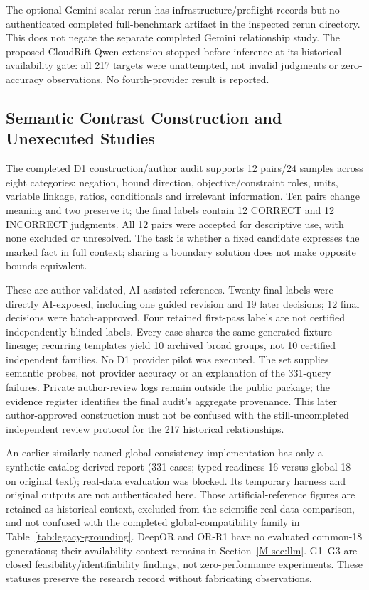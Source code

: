 The optional Gemini scalar rerun has infrastructure/preflight records but no authenticated completed full-benchmark artifact in the inspected rerun directory. This does not negate the separate completed Gemini relationship study. The proposed CloudRift Qwen extension stopped before inference at its historical availability gate: all 217 targets were unattempted, not invalid judgments or zero-accuracy observations. No fourth-provider result is reported.

\subsection{Semantic Contrast Construction and Unexecuted Studies}
The completed D1 construction/author audit supports 12 pairs/24 samples across eight categories: negation, bound direction, objective/constraint roles, units, variable linkage, ratios, conditionals and irrelevant information. Ten pairs change meaning and two preserve it; the final labels contain 12 CORRECT and 12 INCORRECT judgments. All 12 pairs were accepted for descriptive use, with none excluded or unresolved. The task is whether a fixed candidate expresses the marked fact in full context; sharing a boundary solution does not make opposite bounds equivalent.

These are author-validated, AI-assisted references. Twenty final labels were directly AI-exposed, including one guided revision and 19 later decisions; 12 final decisions were batch-approved. Four retained first-pass labels are not certified independently blinded labels. Every case shares the same generated-fixture lineage; recurring templates yield 10 archived broad groups, not 10 certified independent families. No D1 provider pilot was executed. The set supplies semantic probes, not provider accuracy or an explanation of the 331-query failures. Private author-review logs remain outside the public package; the evidence register identifies the final audit's aggregate provenance. This later author-approved construction must not be confused with the still-uncompleted independent review protocol for the 217 historical relationships.

An earlier similarly named global-consistency implementation has only a synthetic catalog-derived report (331 cases; typed readiness 16 versus global 18 on original text); real-data evaluation was blocked. Its temporary harness and original outputs are not authenticated here. Those artificial-reference figures are retained as historical context, excluded from the scientific real-data comparison, and not confused with the completed global-compatibility family in Table~\ref{tab:legacy-grounding}. DeepOR and OR-R1 have no evaluated common-18 generations; their availability context remains in Section~\ref{M-sec:llm}. G1--G3 are closed feasibility/identifiability findings, not zero-performance experiments. These statuses preserve the research record without fabricating observations.
